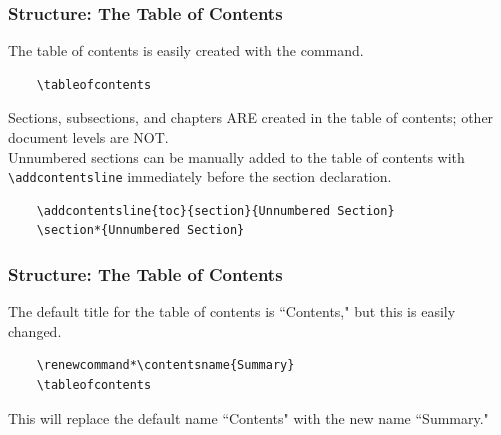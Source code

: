 \begin{frame}[fragile]
\frametitle{Structure: The Table of Contents}
The table of contents is easily created with the  command. \pause
\begin{exampleblock}{}
    \small
    \begin{verbatim}
    \tableofcontents
    \end{verbatim}
\end{exampleblock} \pause
Sections, subsections, and chapters ARE created in the table of contents; other document levels are NOT. \\[\baselineskip] \pause
Unnumbered sections can be manually added to the table of contents with \verb|\addcontentsline| immediately before the section declaration. \pause
\begin{exampleblock}{}
    \small
    \begin{verbatim}
    \addcontentsline{toc}{section}{Unnumbered Section}
    \section*{Unnumbered Section}
    \end{verbatim}
\end{exampleblock}
\end{frame}


\begin{frame}[fragile]
\frametitle{Structure: The Table of Contents}
The default title for the table of contents is ``Contents," but this is easily changed. \pause
\begin{exampleblock}{}
    \small
    \begin{verbatim}
    \renewcommand*\contentsname{Summary}
    \tableofcontents
    \end{verbatim}
\end{exampleblock} 
\vspace{0.2cm}
This will replace the default name ``Contents" with the new name ``Summary."
\end{frame}


